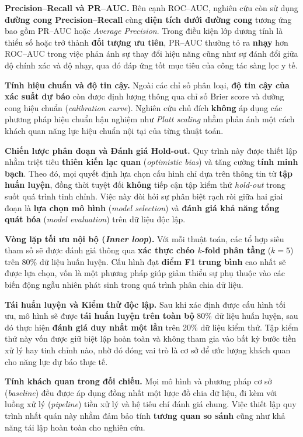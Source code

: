 \documentclass[14pt,a4paper]{extreport}
\begin{document}
\textbf{Precision--Recall và PR--AUC.} Bên cạnh ROC--AUC, nghiên cứu còn sử dụng \textbf{đường cong Precision--Recall} cùng \textbf{diện tích dưới đường cong} tương ứng bao gồm PR--AUC hoặc \textit{Average Precision}. Trong điều kiện lớp dương tính là thiểu số hoặc trở thành \textbf{đối tượng ưu tiên}, PR--AUC thường tỏ ra \textbf{nhạy} hơn ROC--AUC trong việc phản ánh sự thay đổi hiệu năng cũng như sự đánh đổi giữa độ chính xác và độ nhạy, qua đó đáp ứng tốt mục tiêu của công tác sàng lọc y tế.

\textbf{Tính hiệu chuẩn và độ tin cậy.} Ngoài các chỉ số phân loại, \textbf{độ tin cậy của xác suất dự báo} còn được định lượng thông qua chỉ số Brier score và đường cong hiệu chuẩn (\textit{calibration curve}). Nghiên cứu chủ đích \textbf{không} áp dụng các phương pháp hiệu chuẩn hậu nghiệm như \textit{Platt scaling} nhằm phản ánh một cách khách quan năng lực hiệu chuẩn nội tại của từng thuật toán.

\noindent\textbf{Chiến lược phân đoạn và Đánh giá Hold-out.} Quy trình này được thiết lập nhằm triệt tiêu \textbf{thiên kiến lạc quan} (\textit{optimistic bias}) và tăng cường \textbf{tính minh bạch}. Theo đó, mọi quyết định lựa chọn cấu hình chỉ dựa trên thông tin từ \textbf{tập huấn luyện}, đồng thời tuyệt đối \textbf{không} tiếp cận tập kiểm thử \textit{hold-out} trong suốt quá trình tinh chỉnh.\cite{pedregosa2011} Việc này đòi hỏi sự phân biệt rạch ròi giữa hai giai đoạn là \textbf{lựa chọn mô hình} (\textit{model selection}) và \textbf{đánh giá khả năng tổng quát hóa} (\textit{model evaluation}) trên dữ liệu độc lập.

\textbf{Vòng lặp tối ưu nội bộ (\textit{Inner loop}).} Với mỗi thuật toán, các tổ hợp siêu tham số sẽ được đánh giá thông qua \textbf{xác thực chéo $k$-fold phân tầng} ($k=5$) trên 80\% dữ liệu huấn luyện. Cấu hình đạt \textbf{điểm F1 trung bình} cao nhất sẽ được lựa chọn, vốn là một phương pháp giúp giảm thiểu sự phụ thuộc vào các biến động ngẫu nhiên phát sinh trong quá trình phân chia dữ liệu.

\textbf{Tái huấn luyện và Kiểm thử độc lập.} Sau khi xác định được cấu hình tối ưu, mô hình sẽ được \textbf{tái huấn luyện trên toàn bộ} 80\% dữ liệu huấn luyện, sau đó thực hiện \textbf{đánh giá duy nhất một lần} trên 20\% dữ liệu kiểm thử. Tập kiểm thử này vốn được giữ biệt lập hoàn toàn và không tham gia vào bất kỳ bước tiền xử lý hay tinh chỉnh nào, nhờ đó đóng vai trò là cơ sở để ước lượng khách quan cho năng lực dự báo thực tế.

\textbf{Tính khách quan trong đối chiếu.} Mọi mô hình và phương pháp cơ sở (\textit{baseline}) đều được áp dụng đồng nhất một lược đồ chia dữ liệu, đi kèm với luồng xử lý (\textit{pipeline}) tiền xử lý và hệ tiêu chí đánh giá chung. Việc thiết lập quy trình nhất quán này nhằm đảm bảo tính \textbf{tương quan so sánh} cũng như khả năng tái lập hoàn toàn cho nghiên cứu.\cite{pedregosa2011}
\end{document}

